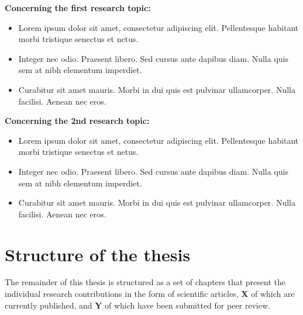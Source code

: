 \documentclass[
  a4paper,
  oneside]{ETH-thesis-template}
\begin{document}
\begin{tcolorbox}[enhanced jigsaw, rightrule=.15mm, colframe=quarto-callout-note-color-frame, colbacktitle=quarto-callout-note-color!10!white, arc=.35mm, opacityback=0, breakable, titlerule=0mm, bottomrule=.15mm, colback=white, title={\textbf{Summary of the chapter}}, coltitle=black, bottomtitle=1mm, toptitle=1mm, toprule=.15mm, leftrule=.75mm, left=2mm, opacitybacktitle=0.6]

\hfill\break
\textbf{Concerning the first research topic:}\\

\begin{itemize}
  \setlength\itemsep{0.8em}
  \item Lorem ipsum dolor sit amet, consectetur adipiscing elit. Pellentesque habitant morbi tristique senectus et netus.
  \item Integer nec odio. Praesent libero. Sed cursus ante dapibus diam. Nulla quis sem at nibh elementum imperdiet.
  \item Curabitur sit amet mauris. Morbi in dui quis est pulvinar ullamcorper. Nulla facilisi. Aenean nec eros.
\end{itemize}

\hfill\break
\textbf{Concerning the 2nd research topic:}\\

\begin{itemize}
  \setlength\itemsep{0.8em}
  \item Lorem ipsum dolor sit amet, consectetur adipiscing elit. Pellentesque habitant morbi tristique senectus et netus.
  \item Integer nec odio. Praesent libero. Sed cursus ante dapibus diam. Nulla quis sem at nibh elementum imperdiet.
  \item Curabitur sit amet mauris. Morbi in dui quis est pulvinar ullamcorper. Nulla facilisi. Aenean nec eros.
\end{itemize}

\end{tcolorbox}


\chapter{Structure of the thesis}\label{sec-struct_chap}

\newpage

The remainder of this thesis is structured as a set of chapters that
present the individual research contributions in the form of scientific
articles, \textbf{X} of which are currently published, and \textbf{Y} of
which have been submitted for peer review.
\end{document}
